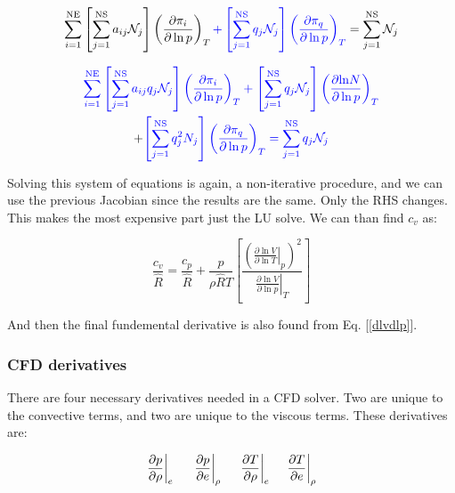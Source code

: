 \documentclass[10pt]{article}
\begin{document}
\begin{flushleft}
\begin{equation}
    \sum_{i=1}^\text{NE} \left[ \sum_{j=1}^\text{NS} a_{ij} \mathcal{N}_j \right] \left( \frac{\partial \pi_i}{\partial \ln p} \right)_T \textcolor{blue}{ + \left[ \sum_{j=1}^\text{NS} q_j \mathcal{N}_j \right] \left( \frac{\partial \pi_q}{\partial \ln p} \right)_T} = \sum_{j=1}^\text{NS} \mathcal{N}_j
\end{equation}

\begin{multline}
    \textcolor{blue}{\sum_{i=1}^\text{NE} \left[ \sum_{j=1}^\text{NS} a_{ij} q_j \mathcal{N}_j \right] \left( \frac{\partial \pi_i}{\partial \ln p} \right)_T + \left[ \sum_{j=1}^\text{NS} q_j \mathcal{N}_j \right] \left( \frac{\partial \mathcal\ln {N}}{\partial \ln p} \right)_T} \\ + \textcolor{blue}{\left[ \sum_{j=1}^\text{NS} q_j^2 \mathcal{}N_j \right] \left( \frac{\partial \pi_q}{\partial \ln p} \right)_T = \sum_{j=1}^\text{NS} q_j \mathcal{N}_j}
\end{multline}

Solving this system of equations is again, a non-iterative procedure, and we can use the previous Jacobian since the results are the same. Only the RHS changes. This makes the most expensive part just the LU solve. We can than find $c_v$ as:

\begin{equation}
    \frac{c_v}{\hat{R}} = \frac{c_p}{\hat{R}} + \frac{p}{\rho \hat{R} T} \left[ \frac{\left(\left.\frac{\partial \ln V}{\partial \ln T}\right|_p \right)^2}{\left. \frac{\partial \ln V}{\partial \ln p} \right|_T} \right]
\end{equation}

And then the final fundemental derivative is also found from Eq. [\ref{dlvdlp}].

\subsubsection{CFD derivatives}
There are four necessary derivatives needed in a CFD solver. Two are unique to the convective terms, and two are unique to the viscous terms. These derivatives are:

\begin{equation}
    \left.\frac{\partial p}{\partial \rho}\right|_e \hspace{5mm} \left.\frac{\partial p}{\partial e}\right|_\rho \hspace{5mm} \frac{\partial T}{\partial \rho}\bigg|_e \hspace{5mm} \frac{\partial T}{\partial e}\bigg|_\rho
\end{equation}


\end{flushleft}
\end{document}
